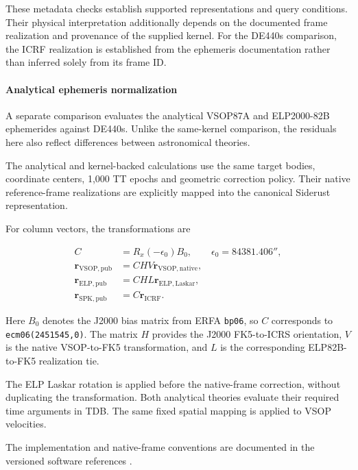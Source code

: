 These metadata checks establish supported representations and query conditions. Their physical
interpretation additionally depends on the documented frame realization and provenance of the
supplied kernel. For the DE440s comparison, the ICRF realization is established from the ephemeris
documentation rather than inferred solely from its frame ID.

\paragraph{Analytical ephemeris normalization}

A separate comparison evaluates the analytical VSOP87A and ELP2000-82B ephemerides against DE440s.
Unlike the same-kernel comparison, the residuals here also reflect differences between astronomical
theories.

The analytical and kernel-backed calculations use the same target bodies, coordinate centers, 1,000
TT epochs and geometric correction policy. Their native reference-frame realizations are explicitly
mapped into the canonical Siderust representation.

For column vectors, the transformations are

\begin{align}
    C & = R_x(-\epsilon_0)B_0,
    \qquad \epsilon_0=84381.406'',                 \\
    \boldsymbol r_{\mathrm{VSOP,pub}}
      & = CHV\boldsymbol r_{\mathrm{VSOP,native}}, \\
    \boldsymbol r_{\mathrm{ELP,pub}}
      & = CHL\boldsymbol r_{\mathrm{ELP,Laskar}},  \\
    \boldsymbol r_{\mathrm{SPK,pub}}
      & = C\boldsymbol r_{\mathrm{ICRF}}.
\end{align}

Here $B_0$ denotes the J2000 bias matrix from ERFA \texttt{bp06}, so $C$ corresponds to
\texttt{ecm06(2451545,0)}. The matrix $H$ provides the J2000 FK5-to-ICRS orientation, $V$ is the
native VSOP-to-FK5 transformation, and $L$ is the corresponding ELP82B-to-FK5 realization tie.

The ELP Laskar rotation is applied before the native-frame correction, without duplicating the
transformation. Both analytical theories evaluate their required time arguments in TDB. The same
fixed spatial mapping is applied to VSOP velocities.

The implementation and native-frame conventions are documented in the versioned software references
\cite{siderustFrameImplementation,siderustFrames}.

